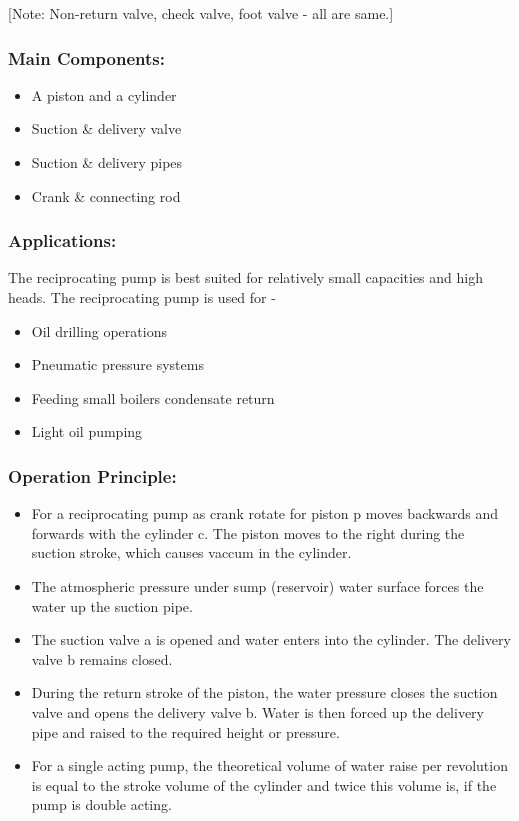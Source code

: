 \documentclass{article}
\begin{document}
[Note: Non-return valve, check valve, foot valve -  all are same.]

\subsubsection*{Main Components:}
\begin{itemize}
  \item A piston and a cylinder 
  \item Suction \& delivery valve 
  \item Suction \& delivery pipes 
  \item Crank \& connecting rod 
\end{itemize}


\subsubsection*{Applications:}
The reciprocating pump is best suited for relatively small capacities and high heads. The reciprocating pump is used for - 
\begin{itemize}
  \item Oil drilling operations 
  \item Pneumatic pressure systems 
  \item Feeding small boilers condensate return 
  \item Light oil pumping 
\end{itemize}

\subsubsection*{Operation Principle:}
\begin{itemize}
  \item For a reciprocating pump as crank rotate for piston p moves backwards and forwards with the cylinder c. The piston moves to the right during the suction stroke, which causes vaccum in the cylinder. 
  \item The atmospheric pressure under sump (reservoir) water surface forces the water up the suction pipe. 
  \item The suction valve a is opened and water enters into the cylinder. The delivery valve b remains closed.
  \item During the return stroke of the piston, the water pressure closes the suction valve and opens the delivery valve b. Water is then forced up the delivery pipe and raised to the required height or pressure. 
  \item For a single acting pump, the theoretical volume of water raise per revolution is equal to the stroke volume of the cylinder and twice this volume is, if the pump is double acting. 
\end{itemize}
\end{document}
